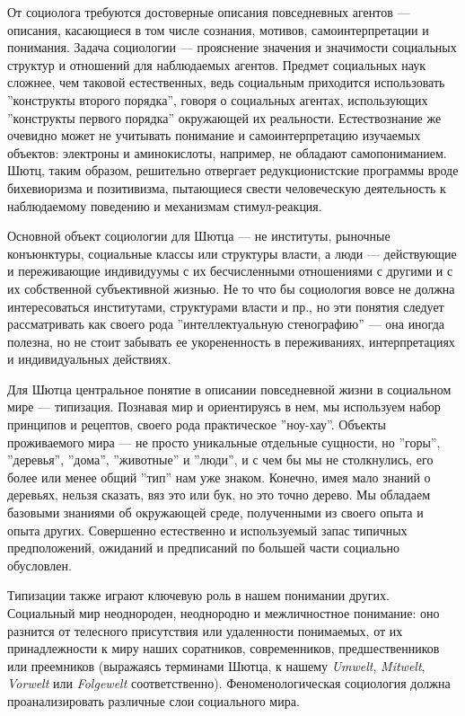 \documentclass[11pt]{book}
\begin{document}
От социолога требуются достоверные описания повседневных агентов --- описания, касающиеся в том числе сознания, мотивов, самоинтерпретации и понимания. Задача социологии --- прояснение значения и значимости социальных структур и отношений для наблюдаемых агентов. Предмет социальных наук сложнее, чем таковой естественных, ведь социальным приходится использовать ''конструкты второго порядка'', говоря о социальных агентах, использующих ''конструкты первого порядка'' окружающей их реальности. Естествознание же очевидно может не учитывать понимание и самоинтерпретацию изучаемых объектов: электроны и аминокислоты, например, не обладают самопониманием. Шютц, таким образом, решительно отвергает редукционистские программы вроде бихевиоризма и позитивизма, пытающиеся свести человеческую деятельность к наблюдаемому поведению и механизмам стимул-реакция.

Основной объект социологии для Шютца --- не институты, рыночные конъюнктуры, социальные классы или структуры власти, а люди --- действующие и переживающие индивидуумы с их бесчисленными отношениями с другими и с их собственной субъективной жизнью. Не то что бы социология вовсе не должна интересоваться институтами, структурами власти и пр., но эти понятия следует рассматривать как своего рода ''интеллектуальную стенографию'' --- она иногда полезна, но не стоит забывать ее укорененность в переживаниях, интерпретациях и индивидуальных действиях.

Для Шютца центральное понятие в описании повседневной жизни в социальном мире --- типизация. Познавая мир и ориентируясь в нем, мы используем набор принципов и рецептов, своего рода практическое ''ноу-хау''. Объекты проживаемого мира --- не просто уникальные отдельные сущности, но ''горы'', ''деревья'', ''дома'', ''животные'' и ''люди'', и с чем бы мы не столкнулись, его более или менее общий ''тип'' нам уже знаком. Конечно, имея мало знаний о деревьях, нельзя сказать, вяз это или бук, но это точно дерево. Мы обладаем базовыми знаниями об окружающей среде, полученными из своего опыта и опыта других. Совершенно естественно и используемый запас типичных предположений, ожиданий и предписаний по большей части социально обусловлен.

Типизации также играют ключевую роль в нашем понимании других. Социальный мир неоднороден, неоднородно и межличностное понимание: оно разнится от телесного присутствия или удаленности понимаемых, от их принадлежности к миру наших соратников, современников, предшественников или преемников (выражаясь терминами Шютца, к нашему \textit{Umwelt}, \textit{Mitwelt}, \textit{Vorwelt} или \textit{Folgewelt} соответственно). Феноменологическая социология должна проанализировать различные слои социального мира.
\end{document}
